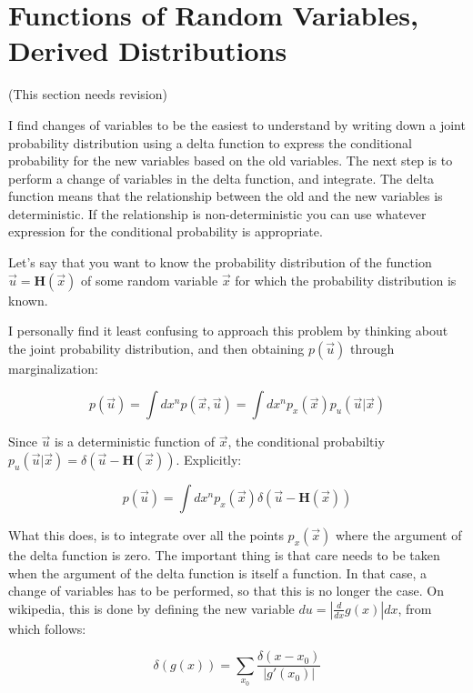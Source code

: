 \section{Functions of Random Variables, Derived Distributions}

(This section needs revision)

I find changes of variables to be the easiest to understand by writing down a joint probability distribution using a delta function to express the conditional probability for the new variables based on the old variables. The next step is to perform a change of variables in the delta function, and integrate. The delta function means that the relationship between the old and the new variables is deterministic. If the relationship is non-deterministic you can use whatever expression for the conditional probability is appropriate.

Let's say that you want to know the probability distribution of the function $\vec{u} = \mathbf{H}(\vec{x})$ of some random variable $\vec{x}$ for which the probability distribution is known.

I personally find it least confusing to approach this problem by thinking about the joint probability distribution, and then obtaining $p(\vec{u})$ through marginalization:

\begin{equation}
p(\vec{u}) = \int dx^n p(\vec{x},\vec{u}) = \int dx^n p_x(\vec{x}) p_u(\vec{u}|\vec{x})
\end{equation}

Since $\vec{u}$ is a deterministic function of $\vec{x}$, the conditional probabiltiy $p_u(\vec{u}|\vec{x}) = \delta(\vec{u} - \mathbf{H}(\vec{x}))$. Explicitly:

\begin{equation}
p(\vec{u}) = \int dx^n p_x(\vec{x}) \delta(\vec{u} - \mathbf{H}(\vec{x}))
\end{equation}

What this does, is to integrate over all the points $p_x(\vec{x})$ where the argument of the delta function is zero. The important thing is that care needs to be taken when the argument of the delta function is itself a function. In that case, a change of variables has to be performed, so that this is no longer the case. On wikipedia, this is done by defining the new variable $du = |\frac{d}{dx}g(x)|dx$, from which follows:

\begin{equation}
\delta(g(x)) = \sum_{x_0} \frac{\delta(x-x_0)}{|g'(x_0)|}
\end{equation}

